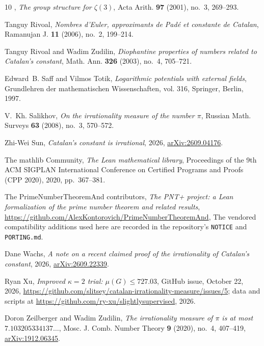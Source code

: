 \documentclass[11pt]{amsart}
\theoremstyle{definition}
\theoremstyle{remark}
\numberwithin{equation}{section}
\begin{document}
\begin{thebibliography}{10}
\bysame, \emph{The group structure for {$\zeta(3)$}}, Acta Arith. \textbf{97}
  (2001), no.~3, 269--293.

Tanguy Rivoal, \emph{Nombres d'{E}uler, approximants de {P}ad\'e et constante
  de {C}atalan}, Ramanujan J. \textbf{11} (2006), no.~2, 199--214.

Tanguy Rivoal and Wadim Zudilin, \emph{Diophantine properties of numbers
  related to {C}atalan's constant}, Math. Ann. \textbf{326} (2003), no.~4,
  705--721.

Edward~B. Saff and Vilmos Totik, \emph{Logarithmic potentials with external
  fields}, Grundlehren der mathematischen Wissenschaften, vol. 316, Springer,
  Berlin, 1997.

V.~Kh. Salikhov, \emph{On the irrationality measure of the number {$\pi$}},
  Russian Math. Surveys \textbf{63} (2008), no.~3, 570--572.

Zhi-Wei Sun, \emph{Catalan's constant is irrational}, 2026,
  \href{https://arxiv.org/abs/2609.04176}{arXiv:2609.04176}.

{The mathlib Community}, \emph{The {L}ean mathematical library}, Proceedings of
  the 9th ACM SIGPLAN International Conference on Certified Programs and Proofs
  (CPP 2020), 2020, pp.~367--381.

{The PrimeNumberTheoremAnd contributors}, \emph{The {PNT+} project: a {L}ean
  formalization of the prime number theorem and related results},
  \url{https://github.com/AlexKontorovich/PrimeNumberTheoremAnd}, The vendored
  compatibility additions used here are recorded in the repository's
  \texttt{NOTICE} and \texttt{PORTING.md}.

Dane Wachs, \emph{A note on a recent claimed proof of the irrationality of
  {C}atalan's constant}, 2026,
  \href{https://arxiv.org/abs/2609.22339}{arXiv:2609.22339}.

Ryan Xu, \emph{Improved {$\kappa=2$} trial: {$\mu(G)\le727.03$}}, GitHub issue,
  October 22, 2026,
  \url{https://github.com/slitsey/catalan-irrationality-measure/issues/5}; data
  and scripts at \url{https://github.com/ry-xu/slightlysupervised}, 2026.

Doron Zeilberger and Wadim Zudilin, \emph{The irrationality measure of {$\pi$}
  is at most {$7.103205334137\ldots$}}, Mosc. J. Comb. Number Theory \textbf{9}
  (2020), no.~4, 407--419,
  \href{https://arxiv.org/abs/1912.06345}{arXiv:1912.06345}.


\end{thebibliography}
\end{document}
